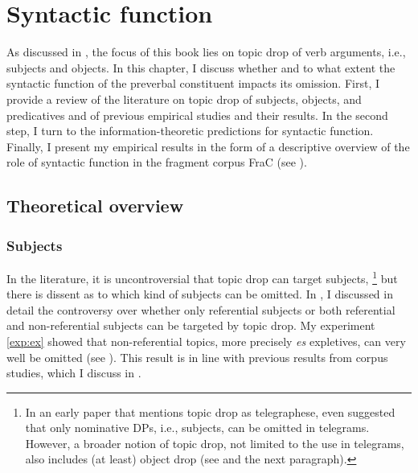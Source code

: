\chapter{Syntactic function}\label{ch:usage.function}
As discussed in , the focus of this book lies on topic drop of verb arguments,  i.e., subjects and objects.
In this chapter, I discuss whether and to what extent the syntactic function of the preverbal constituent impacts its omission.
First, I provide a review of the literature on topic drop of subjects, objects, and predicatives and of previous empirical studies and their results.
In the second step, I turn to the information-theoretic predictions for syntactic function.
Finally, I present my empirical results in the form of a descriptive overview of the role of syntactic function in the fragment corpus FraC (see ).

\section{Theoretical overview}\label{sec:usage.function.theory}
\subsection{Subjects}
In the literature, it is uncontroversial that topic drop can target subjects,%
\footnote{In an early paper that mentions topic drop as telegraphese, \citet[190]{reis1982} even suggested that only nominative  DPs, i.e., subjects, can be omitted in telegrams.
However, a broader notion of topic drop, not limited to the use in telegrams, also includes (at least) object drop (see \cite{ross1982,reis2000} and the next paragraph).
}
%
but there is dissent as to which kind of subjects can be omitted.
In , I discussed in detail the controversy over whether only referential subjects \citep{fries1988, cardinaletti1990} or both referential and non-referential subjects \citep{reis2000, frick2017, ruppenhofer2018} can be targeted by topic drop.
My experiment \ref*{exp:ex} showed that non-referential topics, more precisely \textit{es} expletives, can very well be omitted (see ).
This result is in line with previous results from corpus studies, which I discuss in .

